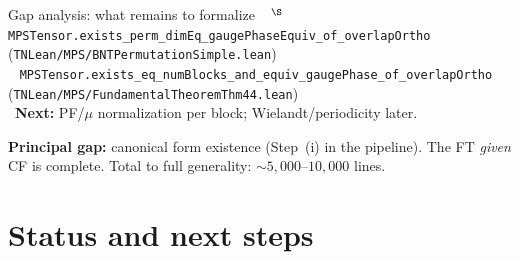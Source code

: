 \documentclass[aspectratio=169,10pt]{beamer}
\begin{document}
\begin{frame}{Gap analysis: what remains to formalize}
{{        %
        \textcolor{leangreen}{\checkmark}~%
          $^{\S}$\,\texttt{MPSTensor.exists\_perm\_dimEq\_gaugePhaseEquiv\_of\_overlapOrtho}\\
          \quad(\texttt{TNLean/MPS/BNTPermutationSimple.lean})~\cite{Cirac2021Matrix}\\[0.15em]
        \textcolor{leangreen}{\checkmark}~%
          \texttt{MPSTensor.exists\_eq\_numBlocks\_and\_equiv\_gaugePhase\_of\_overlapOrtho}\\
          \quad(\texttt{TNLean/MPS/FundamentalTheoremThm44.lean})~\cite{Cirac2021Matrix}\\[0.15em]
        \textcolor{amber}{\textbullet}~\textbf{Next:} PF/$\mu$ normalization per block;
          Wielandt/periodicity later.
    }}

    \vspace{0.05em}
    \textcolor{dimwhite}{\footnotesize
    \textbf{Principal gap:} canonical form existence (Step~(i) in the pipeline).
    The FT \emph{given} CF is complete.
    Total to full generality: ${\sim}5{,}000$--$10{,}000$ lines.}
\end{frame}

\section{Status and next steps}
\end{document}

